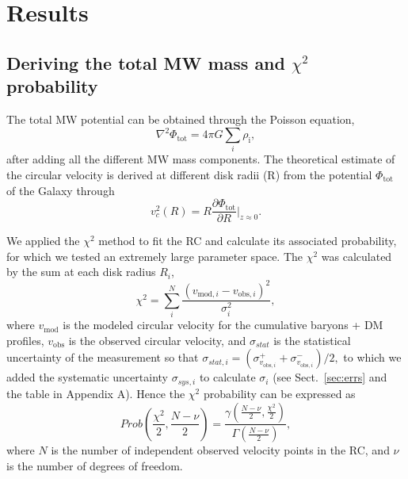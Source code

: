 \documentclass{aa}
\begin{document}
\section{Results}
\label{results}
\subsection{Deriving the total MW mass and $\chi^2$ probability}
\label{chi2proba}

The total MW potential can be obtained through the Poisson equation,
\begin{equation}
\nabla^2\Phi_\mathrm{tot}=4\pi G\sum_i\rho_\mathrm{i}
,\end{equation}
after adding all the different MW mass components. The theoretical estimate of the circular velocity is derived at different disk radii (R) from the potential $\Phi_\mathrm{tot}$ of the Galaxy through
\begin{equation}
    v_c^2(R)=R\frac{\partial \Phi_\mathrm{tot}}{\partial R}|_{z\approx 0}
    \label{eq1}
.\end{equation}

We applied the $\chi^2$ method to fit the RC and calculate its associated probability, for which we tested an extremely large parameter space. The $\chi^2$ was calculated by the sum at each disk radius $R_i$,
\begin{equation}
    \chi^2=\sum_i^N\frac{(v_{\mathrm{mod},i}-v_{\mathrm{obs},i})^2}{\sigma_i^2}
,\end{equation}
where $v_{\mathrm{mod}}$ is the modeled circular velocity for the cumulative baryons + DM profiles, $v_{\mathrm{obs}}$ is the observed circular velocity, and $\sigma_{stat}$ is the statistical uncertainty of the measurement so that $\sigma_{stat,i}=(\sigma^{+}_{v_{\mathrm{obs},i}}+\sigma^{-}_{v_{\mathrm{obs},i}})/{2,}$ to which we added the systematic uncertainty $\sigma_{sys,i}$ to calculate $\sigma_i$ (see Sect.~\ref{sec:errs} and the table in Appendix A). Hence the $\chi^2$ probability can be expressed as 
\begin{equation}
Prob\left( \frac{ \chi^2}{2}, \frac{N-\nu}{2} \right) = \frac{\gamma\left( \frac{N-\nu}{2}, \frac{ \chi^2}{2} \right)}{\Gamma\left( \frac{N-\nu}{2}\right)}
,\end{equation}
where $N$ is the number of independent observed velocity points in the \citet{Eilers2019} RC, and $\nu$ is the number of degrees of freedom.
\end{document}
